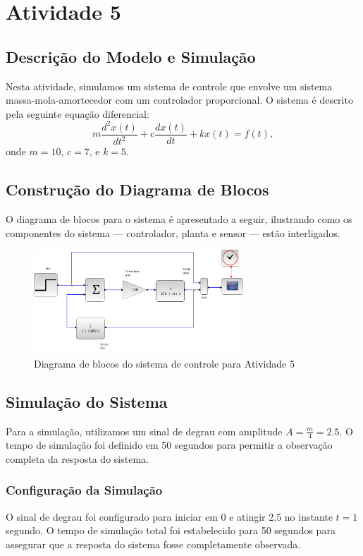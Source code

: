 \section{Atividade 5}

\subsection{Descrição do Modelo e Simulação}
Nesta atividade, simulamos um sistema de controle que envolve um sistema massa-mola-amortecedor com um controlador proporcional. O sistema é descrito pela seguinte equação diferencial:
\[
    m\frac{d^2x(t)}{dt^2} + c\frac{dx(t)}{dt} + kx(t) = f(t),
\]
onde \( m = 10 \), \( c = 7 \), e \( k = 5 \).

\subsection{Construção do Diagrama de Blocos}
O diagrama de blocos para o sistema é apresentado a seguir, ilustrando como os componentes do sistema — controlador, planta e sensor — estão interligados.

\begin{figure}[H]
    \centering
    \includegraphics[width=0.7\textwidth]{5-atividade/assets/diagrama-a.png}
    \caption{Diagrama de blocos do sistema de controle para Atividade 5}
    \label{fig:diagrama_blocos_5}
\end{figure}

\subsection{Simulação do Sistema}
Para a simulação, utilizamos um sinal de degrau com amplitude \( A = \frac{m}{4} = 2.5 \). O tempo de simulação foi definido em 50 segundos para permitir a observação completa da resposta do sistema.

\subsubsection{Configuração da Simulação}
O sinal de degrau foi configurado para iniciar em 0 e atingir 2.5 no instante \( t = 1 \) segundo. O tempo de simulação total foi estabelecido para 50 segundos para assegurar que a resposta do sistema fosse completamente observada.


